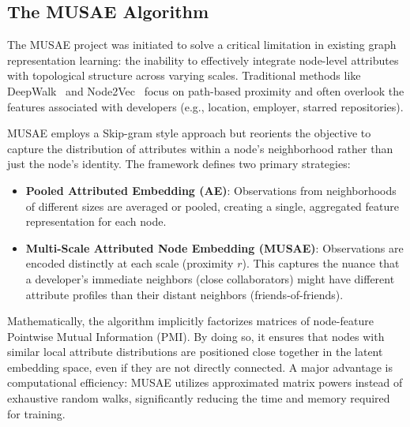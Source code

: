 \documentclass[letterpaper]{article}
\begin{document}
\subsection{The MUSAE Algorithm}

The MUSAE project was initiated to solve a critical limitation in existing graph representation learning: the inability to effectively integrate node-level attributes with topological structure across varying scales. Traditional methods like DeepWalk~\cite{perozzi2014deepwalk} and Node2Vec~\cite{grover2016node2vec} focus on path-based proximity and often overlook the features associated with developers (e.g., location, employer, starred repositories).

MUSAE employs a Skip-gram style approach but reorients the objective to capture the distribution of attributes within a node's neighborhood rather than just the node's identity. The framework defines two primary strategies:

\begin{itemize}
  \item \textbf{Pooled Attributed Embedding (AE)}: Observations from neighborhoods of different sizes are averaged or pooled, creating a single, aggregated feature representation for each node.
  \item \textbf{Multi-Scale Attributed Node Embedding (MUSAE)}: Observations are encoded distinctly at each scale (proximity $r$). This captures the nuance that a developer's immediate neighbors (close collaborators) might have different attribute profiles than their distant neighbors (friends-of-friends).
\end{itemize}

Mathematically, the algorithm implicitly factorizes matrices of node-feature Pointwise Mutual Information (PMI). By doing so, it ensures that nodes with similar local attribute distributions are positioned close together in the latent embedding space, even if they are not directly connected. A major advantage is computational efficiency: MUSAE utilizes approximated matrix powers instead of exhaustive random walks, significantly reducing the time and memory required for training.
\end{document}
